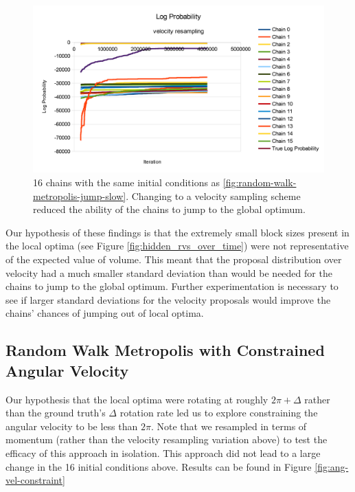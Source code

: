 \documentclass[runningheads]{llncs}
\begin{document}
\begin{figure}[t]
\begin{center}
   \includegraphics[width=0.8\linewidth]{figs/velocity-resampling.png}
\end{center}
   \caption{16 chains with the same initial conditions as 
        \ref{fig:random-walk-metropolis-jump-slow}. Changing to a velocity 
        sampling scheme reduced the ability of the chains to jump to the global 
        optimum.}
\label{fig:velocity-resampling}
\end{figure}

Our hypothesis of these findings is that the extremely small block sizes present 
in the local optima (see Figure \ref{fig:hidden_rvs_over_time}) were not 
representative of the expected value of volume. This meant that the proposal 
distribution over velocity had a much smaller standard deviation than would be 
needed for the chains to jump to the global optimum. Further experimentation is 
necessary to see if larger standard deviations for the velocity proposals would 
improve the chains' chances of jumping out of local optima.

\subsection{Random Walk Metropolis with Constrained Angular Velocity}

Our hypothesis that the local optima were rotating at roughly $2\pi + \Delta$ 
rather than the ground truth's $\Delta$ rotation rate led us to explore 
constraining the angular velocity to be less than $2\pi$. Note that we resampled 
in terms of momentum (rather than the velocity resampling variation above) to 
test the efficacy of this approach in isolation. This approach did 
not lead to a large change in the 16 initial conditions above. Results can be 
found in Figure \ref{fig:ang-vel-constraint}
\end{document}
